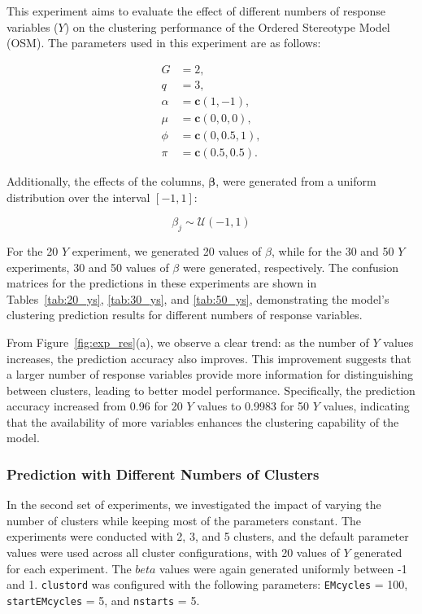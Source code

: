 \documentclass{article}
\begin{document}
This experiment aims to evaluate the effect of different numbers of response variables (\( Y \)) on the clustering performance of the Ordered Stereotype Model (OSM). The parameters used in this experiment are as follows:

\[
\begin{aligned}
G &= 2, \\
q &= 3, \\
\alpha &= \mathbf{c}(1, -1), \\
\mu &= \mathbf{c}(0, 0, 0), \\
\phi &= \mathbf{c}(0, 0.5, 1), \\
\pi &= \mathbf{c}(0.5, 0.5).
\end{aligned}
\]

Additionally, the effects of the columns, \(\bm{\beta}\), were generated from a uniform distribution over the interval \([-1, 1]\):

\[
\beta_j \sim \mathcal{U}(-1, 1)
\]

For the 20 \( Y \) experiment, we generated 20 values of \(\beta\), while for the 30 and 50 \( Y \) experiments, 30 and 50 values of \(\beta\) were generated, respectively. 
The confusion matrices for the predictions in these experiments are shown in Tables~\ref{tab:20_ys}, \ref{tab:30_ys}, and \ref{tab:50_ys}, demonstrating the model's clustering prediction results for different numbers of response variables.

From Figure~\ref{fig:exp_res}(a), we observe a clear trend: as the number of \( Y \) values increases, the prediction accuracy also improves. 
This improvement suggests that a larger number of response variables provide more information for distinguishing between clusters, leading to better model performance. 
Specifically, the prediction accuracy increased from 0.96 for 20 \( Y \) values to 0.9983 for 50 \( Y \) values, indicating that the availability of more variables enhances the clustering capability of the model.

\subsubsection*{Prediction with Different Numbers of Clusters}

In the second set of experiments, we investigated the impact of varying the number of clusters while keeping most of the parameters constant. 
The experiments were conducted with 2, 3, and 5 clusters, and the default parameter values were used across all cluster configurations, with 20 values of \( Y \) generated for each experiment. The \(beta\) values were again generated uniformly between -1 and 1. 
\texttt{clustord} was configured with the following parameters: \texttt{EMcycles} = 100, \texttt{startEMcycles} = 5, and \texttt{nstarts} = 5.
\end{document}
